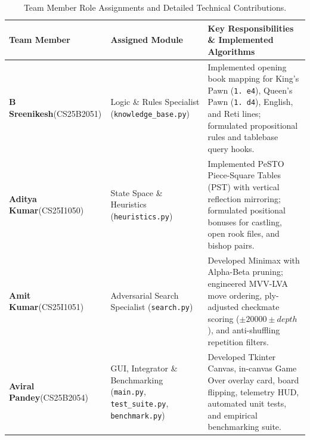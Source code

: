 \documentclass[11pt,a4paper]{article}
\begin{document}
\begin{table}[H]
\centering
\caption{Team Member Role Assignments and Detailed Technical Contributions.}
\label{tab:team_division}
\small
\renewcommand{\arraystretch}{1.25}
\begin{tabularx}{\textwidth}{@{} L{3.0cm} L{3.6cm} Y @{}}
\toprule
\textbf{Team Member} & \textbf{Assigned Module} & \textbf{Key Responsibilities \& Implemented Algorithms} \\
\midrule
\textbf{B Sreenikesh}\newline(CS25B2051) & Logic \& Rules Specialist (\texttt{knowledge\_base.py}) & Implemented opening book mapping for King's Pawn (\texttt{1. e4}), Queen's Pawn (\texttt{1. d4}), English, and Reti lines; formulated propositional rules and tablebase query hooks. \\
\addlinespace
\textbf{Aditya Kumar}\newline(CS25I1050) & State Space \& Heuristics (\texttt{heuristics.py}) & Implemented PeSTO Piece-Square Tables (PST) with vertical reflection mirroring; formulated positional bonuses for castling, open rook files, and bishop pairs. \\
\addlinespace
\textbf{Amit Kumar}\newline(CS25I1051)   & Adversarial Search Specialist (\texttt{search.py}) & Developed Minimax with Alpha-Beta pruning; engineered MVV-LVA move ordering, ply-adjusted checkmate scoring ($\pm 20000 \pm depth$), and anti-shuffling repetition filters. \\
\addlinespace
\textbf{Aviral Pandey}\newline(CS25B2054) & GUI, Integrator \& Benchmarking (\texttt{main.py}, \texttt{test\_suite.py}, \texttt{benchmark.py}) & Developed Tkinter Canvas, in-canvas Game Over overlay card, board flipping, telemetry HUD, automated unit tests, and empirical benchmarking suite. \\
\bottomrule
\end{tabularx}
\end{table}
\end{document}
